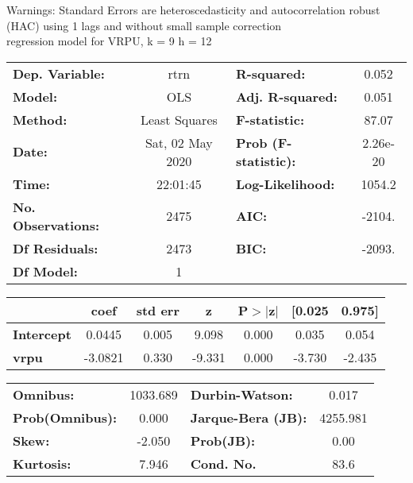 Warnings: \newline
 [1] Standard Errors are heteroscedasticity and autocorrelation robust (HAC) using 1 lags and without small sample correction\\ 

regression model for VRPU, k = 9 h = 12\begin{center}
\begin{tabular}{lclc}
\toprule
\textbf{Dep. Variable:}    &       rtrn       & \textbf{  R-squared:         } &     0.052   \\
\textbf{Model:}            &       OLS        & \textbf{  Adj. R-squared:    } &     0.051   \\
\textbf{Method:}           &  Least Squares   & \textbf{  F-statistic:       } &     87.07   \\
\textbf{Date:}             & Sat, 02 May 2020 & \textbf{  Prob (F-statistic):} &  2.26e-20   \\
\textbf{Time:}             &     22:01:45     & \textbf{  Log-Likelihood:    } &    1054.2   \\
\textbf{No. Observations:} &        2475      & \textbf{  AIC:               } &    -2104.   \\
\textbf{Df Residuals:}     &        2473      & \textbf{  BIC:               } &    -2093.   \\
\textbf{Df Model:}         &           1      & \textbf{                     } &             \\
\bottomrule
\end{tabular}
\begin{tabular}{lcccccc}
                   & \textbf{coef} & \textbf{std err} & \textbf{z} & \textbf{P$> |$z$|$} & \textbf{[0.025} & \textbf{0.975]}  \\
\midrule
\textbf{Intercept} &       0.0445  &        0.005     &     9.098  &         0.000        &        0.035    &        0.054     \\
\textbf{vrpu}      &      -3.0821  &        0.330     &    -9.331  &         0.000        &       -3.730    &       -2.435     \\
\bottomrule
\end{tabular}
\begin{tabular}{lclc}
\textbf{Omnibus:}       & 1033.689 & \textbf{  Durbin-Watson:     } &    0.017  \\
\textbf{Prob(Omnibus):} &   0.000  & \textbf{  Jarque-Bera (JB):  } & 4255.981  \\
\textbf{Skew:}          &  -2.050  & \textbf{  Prob(JB):          } &     0.00  \\
\textbf{Kurtosis:}      &   7.946  & \textbf{  Cond. No.          } &     83.6  \\
\bottomrule
\end{tabular}
\end{center}

